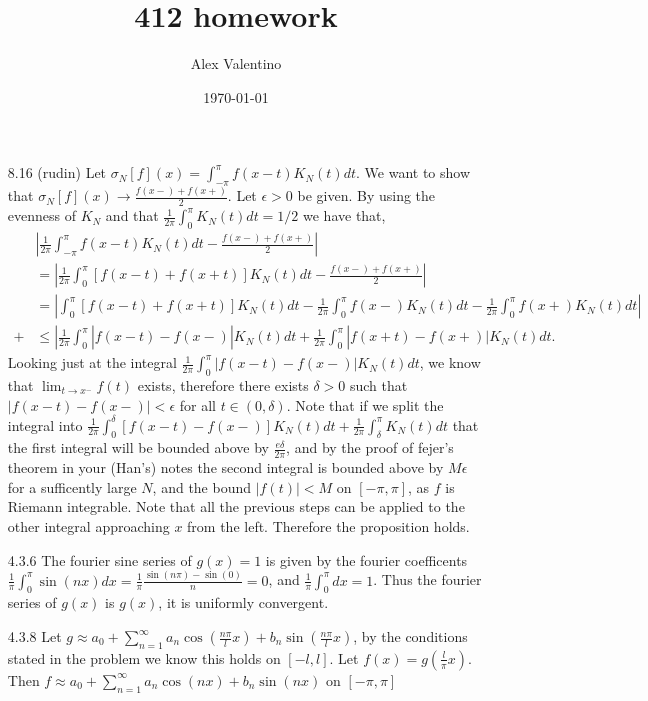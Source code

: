 \documentclass[12pt, letterpaper]{article}
\date{\today}
\author{Alex Valentino}
\title{412 homework}
\begin{document}
\begin{enumerate}
	\item[8.16] (rudin) Let $\sigma_N [f](x) = 
	\int_{-\pi}^\pi f(x-t) K_N(t) dt$.  We want to show that 
	$\sigma_N[f](x) \to \frac{f(x-) + f(x+)}{2}$. Let $\epsilon > 0$
	be given.  By using the evenness 
	of $K_N$ and that $\frac{1}{2 \pi}\int_0^\pi K_N(t)dt = 1/2$ we have that,
	\begin{align*}
	&|\frac{1}{2 \pi}\int_{-\pi}^\pi f(x-t) K_N(t) dt - \frac{f(x-) + f(x+)}{2}|\\
	 &= |\frac{1}{2 \pi}\int_{0}^\pi [f(x-t) + f(x+t)] K_N(t) dt - \frac{f(x-) + f(x+)}{2}|\\ &= |\int_{0}^\pi [f(x-t) + f(x+t)] K_N(t) dt - \frac{1}{2 \pi}\int_0^{\pi}f(x-)K_N(t) dt - \frac{1}{2 \pi}\int_0^{\pi} f(x+)K_N(t) dt  |\\ + 
	 &\leq |\frac{1}{2 \pi}\int_{0}^\pi |f(x-t) - f(x-) | K_N(t) dt 
	 + \frac{1}{2 \pi}\int_{0}^\pi |f(x+t) - f(x+) | K_N(t) dt.
	\end{align*}	
	Looking just at the integral 
	$\frac{1}{2 \pi} \int_{0}^\pi |f(x-t) - f(x-) | K_N(t) dt$, we know
	that $\lim_{t \to x^-} f(t)$ exists, therefore there exists 
	$\delta > 0$ such that $|f(x-t) - f(x-)| < \epsilon$ for all 
	$t \in (0,\delta)$.  Note that if we split the integral into
	$\frac{1}{2 \pi} \int_{0}^\delta [f(x-t) - f(x-) ] K_N(t) dt
	+ \frac{1}{2\pi} \int_{\delta}^\pi K_N(t) dt$ 
	that the first integral will be bounded above by $\frac{e \delta}{2\pi}$, and by the proof of fejer's theorem in your (Han's) notes 
	the second integral is bounded above by $M\epsilon$ for a 
	sufficently large $N$, and the bound $|f(t)| < M$ on $[-\pi, \pi]$,
	as $f$ is Riemann integrable.  Note that all the previous steps can 
	be applied to the other integral approaching $x$ from the left.  
	Therefore the proposition holds.  
	\item[4.3.6] The fourier sine series of $g(x) = 1$ is given 
	by the fourier coefficents $\frac{1}{\pi}\int_0^\pi \sin(nx)dx = \frac{1}{\pi}\frac{\sin(n\pi) - \sin(0)}{n} = 0$, and $\frac{1}{\pi}\int_0^\pi dx = 1$.  Thus the fourier series of $g(x)$ is $g(x)$, 
	it is uniformly convergent.  
	\item[4.3.8] Let $g \approx a_0 + \sum_{n=1}^\infty a_n \cos \left(\frac{n \pi}{l}x \right) + b_n \sin \left(\frac{n \pi}{l}x \right)$, by the conditions stated in the problem we know this holds on $[-l,l]$.   Let $f(x) = g(\frac{l}{\pi}x)$.  Then 
	$f \approx a_0 + \sum_{n=1}^\infty a_n \cos \left(nx \right) + b_n \sin \left(nx \right)$ on $[-\pi,\pi]$

\end{enumerate}
\end{document}
